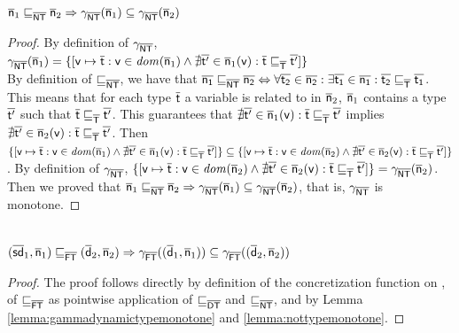 \documentclass{llncs}
\begin{document}
\begin{lemma}
\label{lemma:nottypemonotone}
$\ael{n}_1 \aorder_{\nottype} \ael{n}_2 \Rightarrow \gamma_{\nottype}(\ael{n}_1) \subseteq \gamma_{\nottype}(\ael{n}_2)$
\begin{proof}
By definition of $\gamma_{\nottype}$, $\gamma_{\nottype}(\ael{n}_1)=\{[\statement{v} \mapsto \ael{t} : \statement{v} \in \dom{\ael{n}_1} \land \nexists \ael{t'} \in \ael{n}_1(\statement{v}) : \ael{t} \aorder_\types \ael{t'}]\}$\\
By definition of $\aorder_{\nottype}$, we have that $\ael{n_1} \aorder_{\nottype} \ael{n_2} \Leftrightarrow \forall \ael{t_2} \in \ael{n_2} : \exists \ael{t_1} \in \ael{n_1} : \ael{t_2} \aorder_{\types} \ael{t_1}$. This means that for each type $\ael{t}$ a variable  is related to in $\ael{n}_2$, $\ael{n}_1$ contains a type $\ael{t'}$ such that $\ael{t} \aorder_{\types} \ael{t'}$. This guarantees that $\nexists \ael{t'} \in \ael{n}_1(\statement{v}) : \ael{t} \aorder_\types \ael{t'}$ implies $\nexists \ael{t'} \in \ael{n}_2(\statement{v}) : \ael{t} \aorder_\types \ael{t'}$. Then $\{[\statement{v} \mapsto \ael{t} : \statement{v} \in \dom{\ael{n}_1} \land \nexists \ael{t'} \in \ael{n}_1(\statement{v}) : \ael{t} \aorder_\types \ael{t'}]\} \subseteq \{[\statement{v} \mapsto \ael{t} : \statement{v} \in \dom{\ael{n}_2} \land \nexists \ael{t'} \in \ael{n}_2(\statement{v}) : \ael{t} \aorder_\types \ael{t'}]\}$. By definition of $\gamma_{\nottype}$, $\{[\statement{v} \mapsto \ael{t} : \statement{v} \in \dom{\ael{n}_2} \land \nexists \ael{t'} \in \ael{n}_2(\statement{v}) : \ael{t} \aorder_\types \ael{t'}]\} = \gamma_{\nottype}(\ael{n}_2)$. Then we proved that $\ael{n}_1 \aorder_{\nottype} \ael{n}_2 \Rightarrow \gamma_{\nottype}(\ael{n}_1) \subseteq \gamma_{\nottype}(\ael{n}_2)$, that is, $\gamma_{\nottype}$ is monotone.
\end{proof}
\end{lemma}


\begin{lemma}
\label{lemma:gammanotandtypesdomainmonotone}
\\
$(\ael{sd}_1, \ael{n}_1) \aorder_{\notandtypesdomain} (\ael{d}_2, \ael{n}_2) \Rightarrow \gamma_{\notandtypesdomain}((\ael{d}_1, \ael{n}_1)) \subseteq \gamma_{\notandtypesdomain}((\ael{d}_2, \ael{n}_2))$
\begin{proof}
The proof follows directly by definition of the concretization function on \notandtypesdomain, of $\aorder_{\notandtypesdomain}$ as pointwise application of $\aorder_{\dynamictype}$ and $\aorder_{\nottype}$, and by Lemma \ref{lemma:gammadynamictypemonotone} and \ref{lemma:nottypemonotone}.
\end{proof}
\end{lemma}
\end{document}

